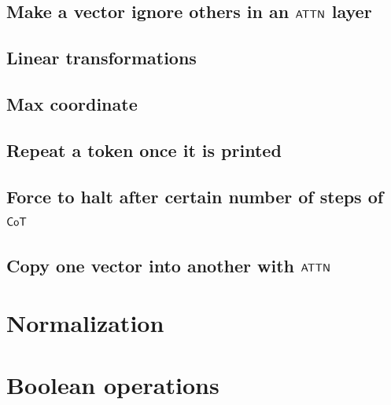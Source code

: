 

\subsection{Make a vector ignore others in an \texorpdfstring{$\mathsf{ATTN}$}{ATTN} layer}\label{ignore-vecs}



\subsection{Linear transformations}\label{lin-tranf}



\subsection{Max coordinate}\label{maximum}



\subsection{Repeat a token once it is printed}\label{repeat-token}



\subsection{Force to halt after certain number of steps of \texorpdfstring{$\mathsf{CoT}$}{CoT}}



\subsection{Copy one vector into another with \texorpdfstring{$\mathsf{ATTN}$}{ATTN}}\label{copy-vector}



\section{Normalization}\label{det-norm}




\section{Boolean operations}\label{det-bool}

